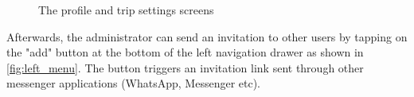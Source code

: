 \documentclass[11pt,a4paper,oneside]{article}
\begin{document}
\begin{figure}[H]
    \centering
    \qquad
    \qquad
    \caption{The profile and trip settings screens }%
    \label{fig:profile_trip_settings}%
\end{figure}

Afterwards, the administrator can send an invitation to other users by tapping on the "add" button at the bottom of the left navigation drawer as shown in \autoref{fig:left_menu}. The button triggers an invitation link sent through other messenger applications (WhatsApp, Messenger etc).
\end{document}
